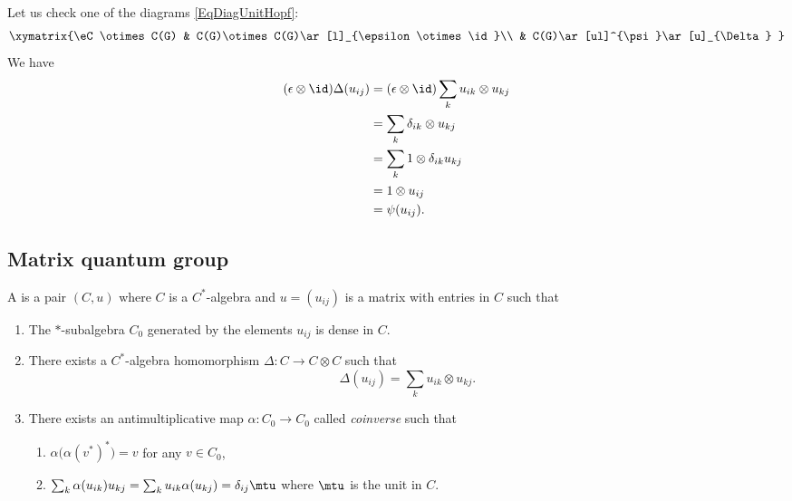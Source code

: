 Let us check one of the diagrams \eqref{EqDiagUnitHopf}:
\begin{equation}
	\xymatrix{%
		\eC\otimes C(G)     &   C(G)\otimes C(G)\ar[l]_{\epsilon\otimes\id}\\
		&   C(G)\ar[ul]^{\psi}\ar[u]_{\Delta}
	}
\end{equation}
We have
\begin{equation}
	\begin{aligned}[]
		(\epsilon\otimes\id)\Delta(u_{ij}) & =(\epsilon\otimes\id)\sum_k u_{ik}\otimes u_{kj} \\
		                                   & =\sum_k\delta_{ik}\otimes u_{kj}                 \\
		                                   & =\sum_k1\otimes \delta_{ik}u_{kj}                \\
		                                   & =1\otimes u_{ij}                                 \\
		                                   & =\psi(u_{ij}).
	\end{aligned}
\end{equation}

\subsection{Matrix quantum group}

\begin{definition}      \label{DefQuantumMatrixGroup}
	A  is a pair $(C,u)$ where $C$ is a $C^*$-algebra and $u=(u_{ij})$ is a matrix with entries in $C$ such that
	\begin{enumerate}
		\item
		      The $*$-subalgebra $C_0$ generated by the elements $u_{ij}$ is dense in $C$.
		\item
		      There exists a $C^*$-algebra homomorphism $\Delta\colon C\to C\otimes C$ such that
		      \begin{equation}
			      \Delta(u_{ij})=\sum_k u_{ik}\otimes u_{kj}.
		      \end{equation}
		\item\label{DefQuantumMatrixGroupItemiii}
		      There exists an antimultiplicative map $\alpha\colon C_0\to C_0$ called \emph{coinverse} such that
		      \begin{enumerate}
			      \item
			            $\alpha\big( \alpha(v^*)^* \big)=v$ for any $v\in C_0$,
			      \item
			            $\sum_k\alpha(u_{ik})u_{kj}=\sum_ku_{ik}\alpha(u_{kj})=\delta_{ij}\mtu$ where $\mtu$ is the unit in $C$.
		      \end{enumerate}
	\end{enumerate}
\end{definition}

